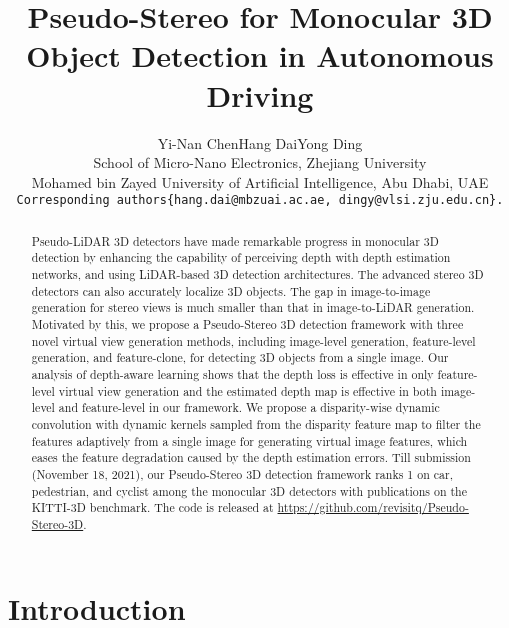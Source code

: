 \documentclass[10pt,twocolumn,letterpaper]{article}
\begin{document}
\title{Pseudo-Stereo for Monocular 3D Object Detection in Autonomous Driving}


\author{Yi-Nan Chen\quad Hang Dai\quad Yong Ding\\
School of Micro-Nano Electronics, Zhejiang University\\
Mohamed bin Zayed University of Artificial Intelligence, Abu Dhabi, UAE
\\
{\tt\small Corresponding authors\{hang.dai@mbzuai.ac.ae, dingy@vlsi.zju.edu.cn\}.}
}


\maketitle

\begin{abstract}
Pseudo-LiDAR 3D detectors have made remarkable progress in monocular 3D detection by enhancing the capability of perceiving depth with depth estimation networks, and using LiDAR-based 3D detection architectures. The advanced stereo 3D detectors can also accurately localize 3D objects. The gap in image-to-image generation for stereo views is much smaller than that in image-to-LiDAR generation. Motivated by this, we propose a Pseudo-Stereo 3D detection framework with three novel virtual view generation methods, including image-level generation, feature-level generation, and feature-clone, for detecting 3D objects from a single image. Our analysis of depth-aware learning shows that the depth loss is effective in only feature-level virtual view generation and the estimated depth map is effective in both image-level and feature-level in our framework. We propose a disparity-wise dynamic convolution with dynamic kernels sampled from the disparity feature map to filter the features adaptively from a single image for generating virtual image features, which eases the feature degradation caused by the depth estimation errors. Till submission (November 18, 2021), our Pseudo-Stereo 3D detection framework ranks 1 on car, pedestrian, and cyclist among the monocular 3D detectors with publications on the KITTI-3D benchmark. The code is released at \url{https://github.com/revisitq/Pseudo-Stereo-3D}.


\end{abstract}



\vspace{-4mm}
\section{Introduction}
\label{sec:intro}
\end{document}
